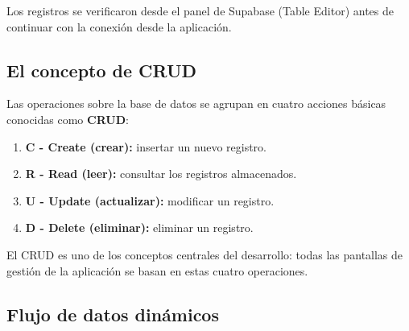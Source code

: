 \begin{table}[H]
  \centering
  \caption{Ejemplo de registros de escenarios}
\end{table}

Los registros se verificaron desde el panel de Supabase (Table Editor)
antes de continuar con la conexi\'on desde la aplicaci\'on.

\subsection{El concepto de CRUD}

Las operaciones sobre la base de datos se agrupan en cuatro acciones
b\'asicas conocidas como \textbf{CRUD}:

\begin{enumerate}
  \item \textbf{C - Create (crear):} insertar un nuevo registro.
  \item \textbf{R - Read (leer):} consultar los registros almacenados.
  \item \textbf{U - Update (actualizar):} modificar un registro.
  \item \textbf{D - Delete (eliminar):} eliminar un registro.
\end{enumerate}

El CRUD es uno de los conceptos centrales del desarrollo: todas las
pantallas de gesti\'on de la aplicaci\'on se basan en estas cuatro
operaciones.

\subsection{Flujo de datos din\'amicos}

